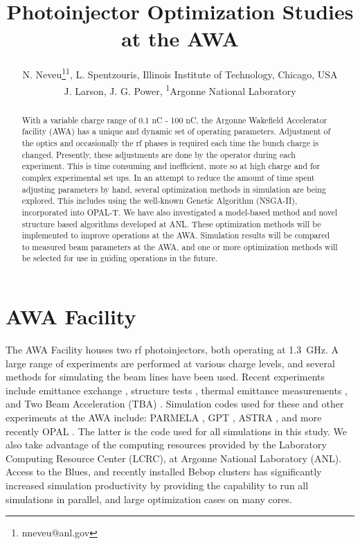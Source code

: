\documentclass[letterpaper,  %
              ]{jacow-2_3}   %
\begin{document}
\title{Photoinjector Optimization Studies at the AWA}

\author{N. Neveu\thanks{nneveu@anl.gov}\textsuperscript{1}, 
	    L. Spentzouris, Illinois Institute of Technology, Chicago, USA \\
	    J. Larson, J. G. Power, \textsuperscript{1}Argonne National Laboratory}
\maketitle

%
\begin{abstract}
With a variable charge range of 0.1 nC - 100 nC, 
the Argonne Wakefield Accelerator facility (AWA) 
has a unique and dynamic set of operating parameters. 
Adjustment of the optics and occasionally the rf phases is 
required each time the bunch charge is changed. 
Presently, these adjustments are done by the operator during each experiment. 
This is time consuming and inefficient, more so at high charge and for complex experimental set ups.
In an attempt to reduce the amount of time spent adjusting parameters by hand, 
several optimization methods in simulation are being explored. 
This includes using the well-known Genetic Algorithm (NSGA-II),
incorporated into OPAL-T. 
We have also investigated a model-based method and novel
structure based algorithms developed at ANL. 
These optimization methods will be implemented to improve operations at the AWA. 
Simulation results will be compared to measured beam parameters at the AWA, 
and one or more optimization methods will be selected for use in guiding operations in the future.
\end{abstract}


\section{AWA Facility}
The AWA Facility houses two rf photoinjectors, both 
operating at \SI{1.3}{GHz}. 
A large range of experiments are performed at various 
charge levels, and several methods for simulating 
the beam lines have been used.
Recent experiments include emittance exchange \cite{eex}, 
structure tests \cite{pets}, thermal emittance measurements \cite{therm}, 
and Two Beam Acceleration (TBA) \cite{tba}. 
Simulation codes used for these and other experiments at
the AWA include: PARMELA \cite{parmela}, GPT \cite{gpt}, 
ASTRA \cite{astra}, and more recently OPAL \cite{opal}. 
The latter is the code used for all simulations in this 
study. 
We also take advantage of the computing resources provided
by the Laboratory Computing Resource Center (LCRC), 
at Argonne National Laboratory (ANL). Access to the 
Blues, and recently installed Bebop clusters has significantly
increased simulation productivity by providing the capability to run 
all simulations in parallel, and large optimization cases
on many cores.
\end{document}
